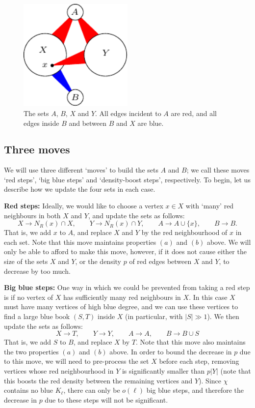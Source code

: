 \documentclass[12pt,reqno]{amsart}
\theoremstyle{definition}
\theoremstyle{remark}
\renewcommand{\to}{\rightarrow}
\begin{document}
\begin{figure}[ht]
\centering
\includegraphics[width=0.5\textwidth]{Ramsey-setup-pic}
\caption{The sets $A$, $B$, $X$ and $Y$. All edges incident to $A$ are red, and all edges inside $B$ and between $B$ and $X$ are blue. }
\label{fig:ABXY}
\end{figure}


\subsection{Three moves}\label{3moves:chat:sec}

We will use three different `moves' to build the sets $A$ and $B$; we call these moves `red steps', `big blue steps' and `density-boost steps', respectively. To begin, let us describe how we update the four sets in each case. 

\medskip
\noindent \textbf{Red steps:} Ideally, we would like to choose a vertex $x \in X$ with `many' red neighbours in both $X$ and $Y$, and update the sets as follows:
$$X \to N_R(x) \cap X, \qquad Y \to N_R(x) \cap Y, \qquad A \to A \cup \{x\}, \qquad B \to B.$$
That is, we add $x$ to $A$, and replace $X$ and $Y$ by the red neighbourhood of $x$ in each set. Note that this move maintains properties $(a)$ and $(b)$ above. We will only be able to afford to make this move, however, if it does not cause either the size of the sets $X$ and $Y$, or the density $p$ of red edges between $X$ and $Y$, to decrease by too much. 

\medskip
\noindent \textbf{Big blue steps:} One way in which we could be prevented from taking a red step is if no vertex of $X$ has sufficiently many red neighbours in $X$. In this case $X$ must have many vertices of high blue degree, and we can use these vertices to find a large blue book $(S,T)$ inside $X$ (in particular, with $|S| \gg 1$). We then update the sets as follows:
$$X \to T, \qquad Y \to Y, \qquad A \to A, \qquad B \to B \cup S$$
That is, we add $S$ to $B$, and replace $X$ by $T$. Note that this move also maintains the two properties $(a)$ and $(b)$ above. In order to bound the decrease in $p$ due to this move, we will need to pre-process the set $X$ before each step, removing vertices whose red neighbourhood in $Y$ is significantly smaller than $p|Y|$ (note that this boosts the red density between the remaining vertices and $Y$). Since $\chi$ contains no blue $K_\ell$, there can only be $o(\ell)$ big blue steps, and therefore the decrease in $p$ due to these steps will not be significant. 
\end{document}
